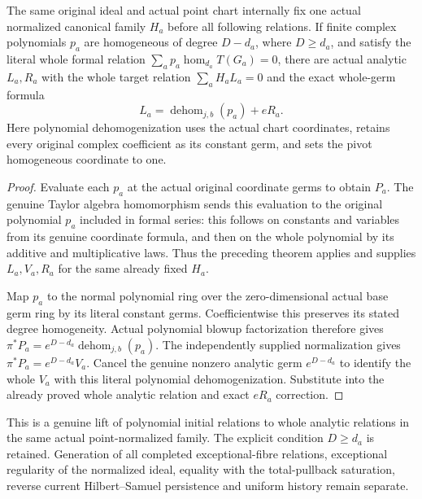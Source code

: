 \begin{theorem}
\label{hir:actual-original-point-polynomial-initial-relation-lifts}
\leanok
The same original ideal and actual point chart internally fix one actual
normalized canonical family $H_a$ before all following relations. If finite
complex polynomials $p_a$ are homogeneous of degree $D-d_a$, where
$D\ge d_a$, and satisfy the literal whole formal relation
$\sum_a p_a\operatorname{hom}_{d_a}T(G_a)=0$, there are actual analytic
$L_a,R_a$ with the whole target relation $\sum_aH_aL_a=0$ and the exact
whole-germ formula
\[
 L_a=\operatorname{dehom}_{j,b}(p_a)+eR_a.
\]
Here polynomial dehomogenization uses the actual chart coordinates,
retains every original complex coefficient as its constant germ,
and sets the pivot homogeneous coordinate to one.
\end{theorem}
\begin{proof}
Evaluate each $p_a$ at the actual original coordinate germs to obtain
$P_a$. The genuine Taylor algebra homomorphism sends this evaluation
to the original polynomial $p_a$ included in formal series: this follows
on constants and variables from its genuine coordinate formula, and
then on the whole polynomial by its additive and multiplicative laws.
Thus the preceding theorem applies and supplies $L_a,V_a,R_a$ for the
same already fixed $H_a$.

Map $p_a$ to the normal polynomial ring over the zero-dimensional
actual base germ ring by its literal constant germs. Coefficientwise
this preserves its stated degree homogeneity. Actual polynomial
blowup factorization therefore gives
$\pi^*P_a=e^{D-d_a}\operatorname{dehom}_{j,b}(p_a)$.
The independently supplied normalization gives
$\pi^*P_a=e^{D-d_a}V_a$. Cancel the genuine nonzero analytic germ
$e^{D-d_a}$ to identify the whole $V_a$ with this literal polynomial
dehomogenization. Substitute into the already proved whole analytic
relation and exact $eR_a$ correction.
\end{proof}

\begin{remark}
This is a genuine lift of polynomial initial relations to whole
analytic relations in the same actual point-normalized family. The
explicit condition $D\ge d_a$ is retained. Generation of all completed
exceptional-fibre relations, exceptional regularity of the normalized
ideal, equality with the total-pullback saturation, reverse current
Hilbert--Samuel persistence and uniform history remain separate.
\end{remark}
